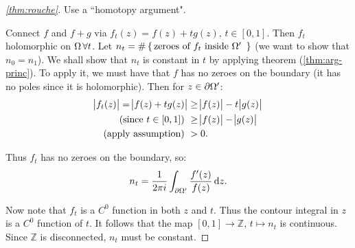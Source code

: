 \begin{proof}[\ref{thm:rouche}] Use a ``homotopy argument".

Connect $f$ and $f+g$ via $f_t(z) = f(z) + tg(z), \, t \in [0,1]$. Then $f_t$ holomorphic on $\Omega \, \forall t$. Let $n_t = \# \set{ \text{zeroes of $f_t$ inside $\Omega '$  }}$ (we want to show that $n_0 = n_1$). We shall show that $n_t$ is constant in $t$ by applying theorem (\ref{thm:arg-princ}). To apply it, we must have that $f $ has no zeroes on the boundary (it has no poles since it is holomorphic). Then for $z \in \partial \Omega '$:
\begin{align*}
    \abs{f_t(z)} = \abs{f(z) + tg(z)} &\geq \abs{f(z)} - t\abs{g(z)}\\
    \text{(since $t\in [0,1] $) }&\geq \abs{f(z)} - \abs{g(z)}\\
    \text{(apply assumption) }&> 0.
\end{align*}

Thus $f_t$ has no zeroes on the boundary, so:
\begin{align*}
    n_t = \frac{1}{2 \pi i} \int_{\partial \om '} \frac{f'(z)}{f(z)} \dif z.
\end{align*}

Now note that $f_t$ is a $C^0$ function in both $z$ and $t$. Thus the contour integral in $z$ is a $C^0 $ function of $t$. It follows that the map $[0,1] \to \mathbb{Z}, \, t \mapsto n_t$ is continuous. Since $\mathbb{Z}$ is disconnected, $n_t$ must be constant.


\end{proof}












































